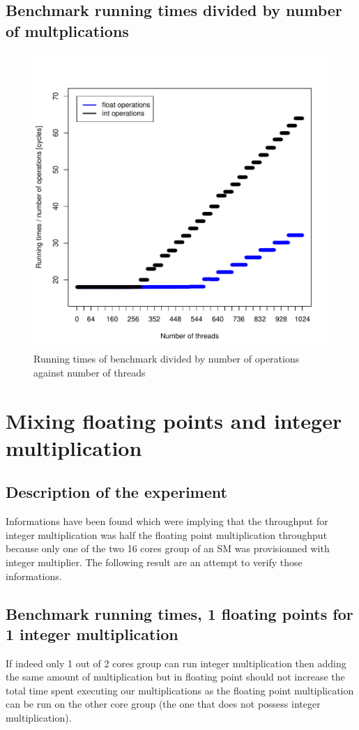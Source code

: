 \documentclass{article}
\begin{document}
    \subsection{Benchmark running times divided by number of multplications}
    \begin{figure}[h]
        \includegraphics[width=\linewidth]{"graphics/latency_estimate"}
        \caption{Running times of benchmark divided by number of operations against number of threads}
    \end{figure}
	\pagebreak

\section{Mixing floating points and integer multiplication}
	\subsection{Description of the experiment}
	Informations have been found which were implying that the throughput for integer multiplication was half the floating point multiplication throughput because only one of the two 16 cores group of an SM was provisionned with integer multiplier.
	The following result are an attempt to verify those informations.
	\subsection{Benchmark running times, 1 floating points for 1 integer multiplication}
	If indeed only 1 out of 2 cores group can run integer multiplication then adding the same amount of multiplication but in floating point should not increase the total time spent executing our multiplications as the floating point multiplication can be run on the other core group (the one that does not possess integer multiplication).
	
\end{document}
